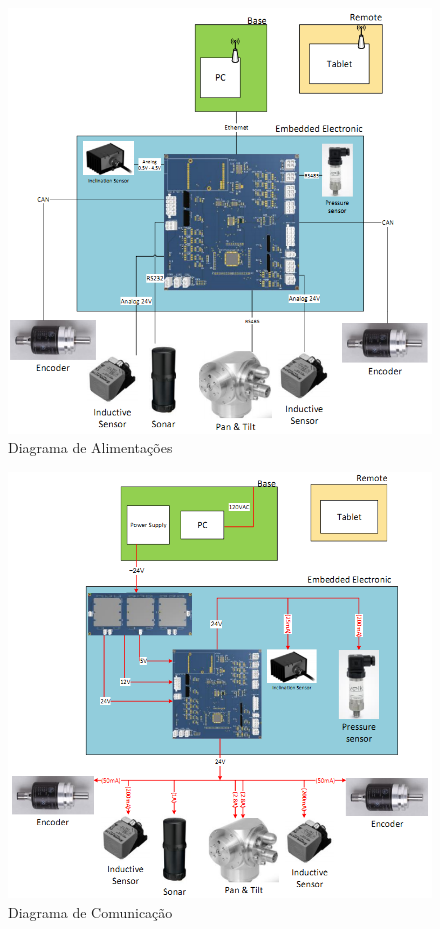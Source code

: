 \begin{figure}[H]
\centering
\includegraphics[width=1\columnwidth]{figs/eletronica/2.png}
\caption{Diagrama de Alimentações}
\label{alimentacao_placa}
\end{figure}

\begin{figure}[H]
\centering
\includegraphics[width=1\columnwidth]{figs/eletronica/3.png}
\caption{Diagrama de Comunicação}
\label{com_placa}
\end{figure}


